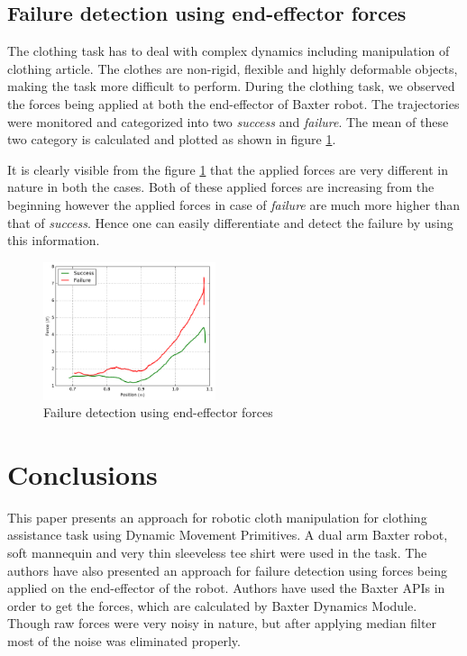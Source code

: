 \documentclass[sigconf]{acmart}
\begin{document}
\subsection{Failure detection using end-effector forces}
The clothing task has to deal with complex dynamics including manipulation of clothing article. The clothes are non-rigid, flexible and highly deformable objects, making the task more difficult to perform. During the clothing task, we observed the forces being applied at both the end-effector of Baxter robot. The trajectories were monitored and categorized into two \textit{success} and \textit{failure}. The mean of these two category is calculated and plotted as shown in figure \ref{position_force}.

It is clearly visible from the figure \ref{position_force} that the applied forces are very different in nature in both the cases. Both of these applied forces are increasing from the beginning however the applied forces in case of \textit{failure} are much more higher than that of \textit{success}. Hence one can easily differentiate and detect the failure by using this information.

\begin{figure}
	\includegraphics[width=0.45\textwidth]{position_force}
	\caption{Failure detection using end-effector forces}
	\label{position_force}
\end{figure}

\section{Conclusions}
\label{conclusions}
This paper presents an approach for robotic cloth manipulation for clothing assistance task using Dynamic Movement Primitives. A dual arm Baxter robot, soft mannequin and very thin sleeveless tee shirt were used in the task. The authors have also presented an approach for failure detection using forces being applied on the end-effector of the robot. Authors have used the Baxter APIs in order to get the forces, which are calculated by Baxter Dynamics Module. Though raw forces were very noisy in nature, but after applying median filter most of the noise was eliminated properly.
\end{document}
